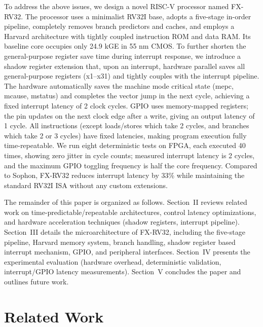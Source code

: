 \documentclass[letterpaper,journal]{IEEEtran}
\begin{document}
To address the above issues, we design a novel RISC-V processor named FX-RV32.
The processor uses a minimalist RV32I base, adopts a five-stage in-order pipeline, completely removes branch predictors and caches, and employs a Harvard architecture with tightly coupled instruction ROM and data RAM.
Its baseline core occupies only 24.9 kGE in 55 nm CMOS.
To further shorten the general-purpose register save time during interrupt response, we introduce a shadow register extension that, upon an interrupt, hardware parallel saves all general-purpose registers (x1--x31) and tightly couples with the interrupt pipeline.
The hardware automatically saves the machine mode critical state (mepc, mcause, mstatus) and completes the vector jump in the next cycle, achieving a fixed interrupt latency of 2 clock cycles.
GPIO uses memory-mapped registers; the pin updates on the next clock edge after a write, giving an output latency of 1 cycle.
All instructions (except loads/stores which take 2 cycles, and branches which take 2 or 3 cycles) have fixed latencies, making program execution fully time-repeatable.
We run eight deterministic tests on FPGA, each executed 40 times, showing zero jitter in cycle counts; measured interrupt latency is 2 cycles, and the maximum GPIO toggling frequency is half the core frequency.
Compared to Sophon, FX-RV32 reduces interrupt latency by 33\% while maintaining the standard RV32I ISA without any custom extensions.

The remainder of this paper is organized as follows.
Section~II reviews related work on time-predictable/repeatable architectures, control latency optimizations, and hardware acceleration techniques (shadow registers, interrupt pipeline).
Section~III details the microarchitecture of FX-RV32, including the five-stage pipeline, Harvard memory system, branch handling, shadow register based interrupt mechanism, GPIO, and peripheral interfaces.
Section~IV presents the experimental evaluation (hardware overhead, deterministic validation, interrupt/GPIO latency measurements).
Section~V concludes the paper and outlines future work.

\section{Related Work}
\end{document}
